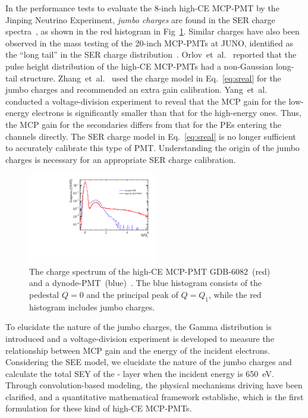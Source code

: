 In the performance tests to evaluate the 8-inch high-CE MCP-PMT by the Jinping Neutrino Experiment,
\emph{jumbo charges} are found in the SER charge spectra~\cite{Zhang:2023ued},
as shown in the red histogram in Fig~\ref{fig:spe_sreal}.
Similar charges have also been observed in the mass testing of the 20-inch MCP-PMTs at JUNO,
identified as the ``long tail'' in the SER charge distribution~\cite{JUNO:2022hlz}.
Orlov~et~al.~\cite{reviewer1} reported that the pulse height distribution of the high-CE MCP-PMTs had a non-Gaussian long-tail structure.
Zhang~et~al.~\cite{2021Gain} used the charge model in Eq.~\eqref{eq:sreal} for the jumbo charges and recommended an extra gain calibration.
Yang~et~al.~\cite{2017MCP} conducted a voltage-division experiment to reveal that the MCP gain for the low-energy electrons is significantly smaller than
that for the high-energy ones.
Thus, the MCP gain for the secondaries differs from that for the PEs entering the channels directly.
The SER charge model in Eq.~\eqref{eq:sreal} is no longer sufficient to accurately calibrate this type of PMT.
Understanding the origin of the jumbo charges is necessary for an appropriate SER charge calibration.
\begin{figure}[!htbp]
	\centering
	\includegraphics[width=0.5\textwidth]{PMTRelated/GTmodel/spe.pdf}
	\caption{The charge spectrum of the high-CE MCP-PMT GDB-6082~(red) and a dynode-PMT~(blue)~\cite{Zhang:2023ued}.
		The blue histogram consists of the pedestal $Q=0$ and the principal peak of $Q=Q_1$, while the red histogram includes jumbo charges.}
	\label{fig:spe_sreal}
\end{figure}

To elucidate the nature of the jumbo charges, the Gamma distribution is introduced and a voltage-division experiment is developed to measure the relationship
between MCP gain and the energy of the incident electrons.
Considering the SEE model, we elucidate the nature of the jumbo charges
and calculate the total SEY of the - layer when the incident energy is \SI{650}{eV}.
Through convolution-based modeling, the physical mechanisms driving have been clarified, and a quantitative mathematical framework establishe, which is the first formulation for these kind of high-CE MCP-PMTs.

